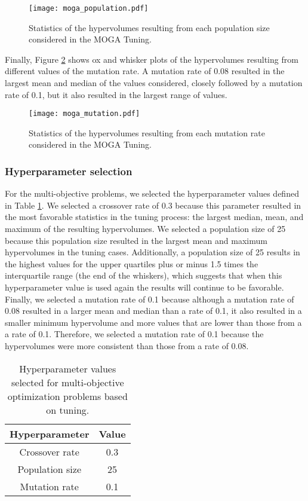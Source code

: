 \begin{figure}[h!]
    \centering 
    \texttt{[image: moga\_population.pdf]}
    \caption{Statistics of the hypervolumes resulting from 
    each population size considered in the MOGA Tuning.}
    \label{fig:moga_population}
\end{figure}

Finally, Figure \ref{fig:moga_mutation} shows ox and whisker plots of 
the hypervolumes 
resulting from different values of the mutation rate.
A mutation rate of 0.08 resulted in the largest mean and median of the 
values considered, closely followed by a mutation rate of 0.1, but it 
also resulted in the largest range of values. 


\begin{figure}[h!]
    \centering 
    \texttt{[image: moga\_mutation.pdf]}
    \caption{Statistics of the hypervolumes resulting from 
    each mutation rate considered in the MOGA Tuning.}
    \label{fig:moga_mutation}
\end{figure}

\subsubsection{Hyperparameter selection}
For the multi-objective problems, we selected the hyperparameter 
values defined in Table \ref{tab:moga_parameters}. We selected 
a crossover rate of 0.3 because this parameter resulted in the 
most favorable statistics in the tuning process: the largest 
median, mean, and maximum of the resulting hypervolumes. We selected 
a population size of 25 because this population size resulted in 
the largest mean and maximum hypervolumes in the tuning cases. 
Additionally, a population size of 25 results in the highest 
values for the upper quartiles plus or minus 1.5 times the interquartile 
range (the end of the whiskers), which suggests that when this 
hyperparameter value is used again the results will continue to be 
favorable. Finally, we selected a mutation rate of 0.1 because 
although a mutation rate of 0.08 resulted in a larger mean and median 
than a rate of 0.1, it also resulted in a smaller minimum hypervolume and 
more values that are lower than those from a a rate of 0.1. Therefore, we 
selected a mutation rate of 0.1 because the hypervolumes were more 
consistent than those from a rate of 0.08. 

\begin{table}[h!]
    \centering 
    \caption{Hyperparameter values selected for multi-objective 
    optimization problems based on tuning.}
    \label{tab:moga_parameters}
    \begin{tabular}{c c}
        \hline
        Hyperparameter & Value \\
        \hline
        Crossover rate & 0.3\\
        Population size & 25\\
        Mutation rate & 0.1\\
        \hline
    \end{tabular}
\end{table}

